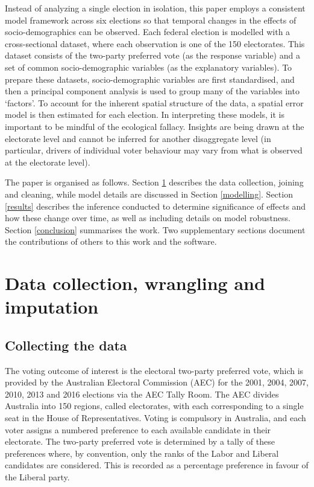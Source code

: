 \documentclass[
  times, doublespace]{anzsauth}
\begin{document}
Instead of analyzing a single election in isolation, this paper employs a consistent model framework across six elections so that temporal changes in the effects of socio-demographics can be observed. Each federal election is modelled with a cross-sectional dataset, where each observation is one of the 150 electorates. This dataset consists of the two-party preferred vote (as the response variable) and a set of common socio-demographic variables (as the explanatory variables). To prepare these datasets, socio-demographic variables are first standardised, and then a principal component analysis is used to group many of the variables into `factors'. To account for the inherent spatial structure of the data, a spatial error model is then estimated for each election. In interpreting these models, it is important to be mindful of the ecological fallacy. Insights are being drawn at the electorate level and cannot be inferred for another disaggregate level (in particular, drivers of individual voter behaviour may vary from what is observed at the electorate level).

The paper is organised as follows. Section \ref{data} describes the data collection, joining and cleaning, while model details are discussed in Section \ref{modelling}. Section \ref{results} describes the inference conducted to determine significance of effects and how these change over time, as well as including details on model robustness. Section \ref{conclusion} summarises the work. Two supplementary sections document the contributions of others to this work and the software.

\hypertarget{data}{%
\section{Data collection, wrangling and imputation}\label{data}}

\hypertarget{collecting-the-data}{%
\subsection{Collecting the data}\label{collecting-the-data}}

The voting outcome of interest is the electoral two-party preferred vote, which is provided by the Australian Electoral Commission (AEC) for the 2001, 2004, 2007, 2010, 2013 and 2016 elections via the AEC Tally Room. The AEC divides Australia into 150 regions, called electorates, with each corresponding to a single seat in the House of Representatives. Voting is compulsory in Australia, and each voter assigns a numbered preference to each available candidate in their electorate. The two-party preferred vote is determined by a tally of these preferences where, by convention, only the ranks of the Labor and Liberal candidates are considered. This is recorded as a percentage preference in favour of the Liberal party.
\end{document}
